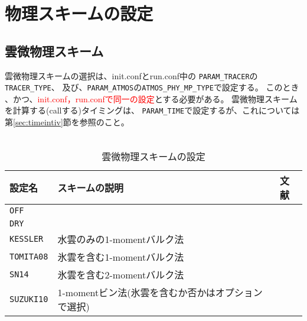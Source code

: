 \section{物理スキームの設定} \label{sec:basic_physics}

\subsection{雲微物理スキーム} \label{sec:basic_microphys}
雲微物理スキームの選択は、init.confとrun.conf中の
\verb|PARAM_TRACER|の\verb|TRACER_TYPE|、
及び、\verb|PARAM_ATMOS|の\verb|ATMOS_PHY_MP_TYPE|で設定する。
このとき{\color{red}{\verb|TRACER_TYPE|と\verb|ATMOS_PHY_MP_TYPE|は同じものを設定し}}
、かつ、\textcolor{red}{init.conf，run.confで同一の設定}とする必要がある。
雲微物理スキームを計算する(callする)タイミングは、
\verb|PARAM_TIME|で設定するが、これについては
第\ref{sec:timeintiv}節を参照のこと。\\



\\

\begin{table}[h]
\begin{center}
  \caption{雲微物理スキームの設定}
  \label{tab:nml_atm_mp}
  \begin{tabularx}{150mm}{lXX} \hline
    \rowcolor[gray]{0.9}  設定名 & スキームの説明 & 文献\\ \hline
     \verb|OFF|      & \textcolor{雲微物理を使用しないが、$TRACER_TYPE$で指定した雲微物理に対応した予報変数を含める} &  \\
     \verb|DRY|      & \textcolor{雲物理を使用しない（予報変数に雲微物理に関連した変数を一切含めない）} &  \\
     \verb|KESSLER|  & 水雲のみの1-momentバルク法 & \citet{kessler_1969} \\
     \verb|TOMITA08| & 氷雲を含む1-momentバルク法 & \citet{tomita_2008} \\
     \verb|SN14|     & 氷雲を含む2-momentバルク法 & \citet{sn_2014} \\
     \verb|SUZUKI10| & 1-momentビン法(氷雲を含むか否かはオプションで選択) & \citet{suzuki_etal_2010} \\
    \hline
  \end{tabularx}
\end{center}
\end{table}

